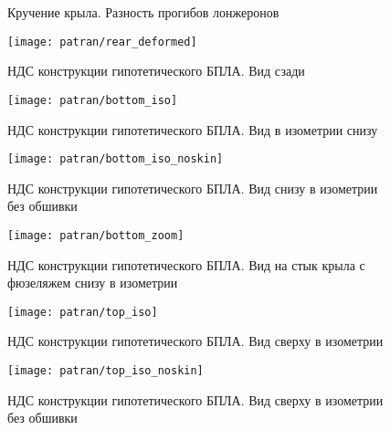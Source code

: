 \begin{figure}[H]
\centering
\def\svgwidth{0.9\textwidth}

\caption{Кручение крыла. Разность прогибов лонжеронов}
\label{fig:WingRotating}
\end{figure}


\begin{figure}[H]
\centering
\texttt{[image: patran/rear\_deformed]}
\caption{НДС конструкции гипотетического БПЛА. Вид сзади}
\label{fig:patranRearDeformed}
\end{figure}


%
%


\begin{figure}[H]
\centering
\texttt{[image: patran/bottom\_iso]}
\caption{НДС конструкции гипотетического БПЛА. Вид в изометрии снизу}
\label{fig:patranBottomIso}
\end{figure}

\begin{figure}[H]
\centering
\texttt{[image: patran/bottom\_iso\_noskin]}
\caption{НДС конструкции гипотетического БПЛА. Вид снизу в изометрии без обшивки}
\label{fig:patranBottomIsoWithoutSkin}
\end{figure}

\begin{figure}[H]
\captionsetup{justification=centering}
\centering
\texttt{[image: patran/bottom\_zoom]}
\caption{НДС конструкции гипотетического БПЛА. Вид на стык крыла с фюзеляжем снизу в изометрии}
\label{fig:patranBottomIsoZoom}
\end{figure}


\begin{figure}[H]
\centering
\texttt{[image: patran/top\_iso]}
\caption{НДС конструкции гипотетического БПЛА. Вид сверху в изометрии}
\label{fig:patranTopIso}
\end{figure}

\begin{figure}[H]
\centering
\texttt{[image: patran/top\_iso\_noskin]}
\caption{НДС конструкции гипотетического БПЛА. Вид сверху в изометрии без обшивки}
\label{fig:patranTopIsoWithoutSk}
\end{figure}

%
